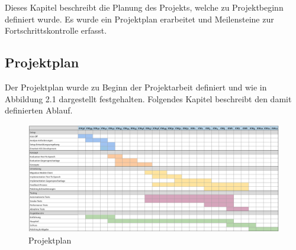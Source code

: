 Dieses Kapitel beschreibt die Planung des Projekts, welche zu Projektbeginn definiert wurde.
Es wurde ein Projektplan erarbeitet und Meilensteine zur Fortschrittskontrolle erfasst.

\subsection{Projektplan}

Der Projektplan wurde zu Beginn der Projektarbeit definiert und wie in Abbildung 2.1 dargestellt festgehalten.
Folgendes Kapitel beschreibt den damit definierten Ablauf.

\begin{figure}[h]
    \centering
    \begin{minipage}[b]{\textwidth}
        \includegraphics[width=\textwidth]{graphics/projektplan}
        \caption{Projektplan}
    \end{minipage}\label{fig:projektplan}
\end{figure}

